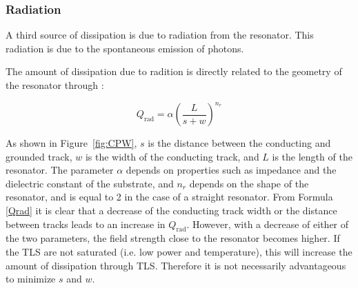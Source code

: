 



    \subsubsection{Radiation}

      A third source of dissipation is due to radiation from the resonator. This radiation is due to the spontaneous emission of photons.

      The amount of dissipation due to radition is directly related to the geometry of the resonator through \cite{sage2011study,Mazin}:

      \begin{equation}
          Q_\text{rad} = \alpha \left( \frac{L}{s + w}\right)^{n_r}
          \label{Qrad}
      \end{equation}

      As shown in Figure~\ref{fig:CPW}, $s$ is the distance between the conducting and grounded track, $w$ is the width of the conducting track, and $L$ is the length of the resonator. The parameter $\alpha$ depends on properties such as impedance and the dielectric constant of the substrate, and $n_r$ depends on the shape of the resonator, and is equal to 2 in the case of a straight resonator. From Formula \ref{Qrad} it is clear that a decrease of the conducting track width or the distance between tracks leads to an increase in $Q_\text{rad}$. However, with a decrease of either of the two parameters, the field strength close to the resonator becomes higher. If the TLS are not saturated (i.e. low power and temperature), this will increase the amount of dissipation through TLS. Therefore it is not necessarily advantageous to minimize $s$ and $w$.


